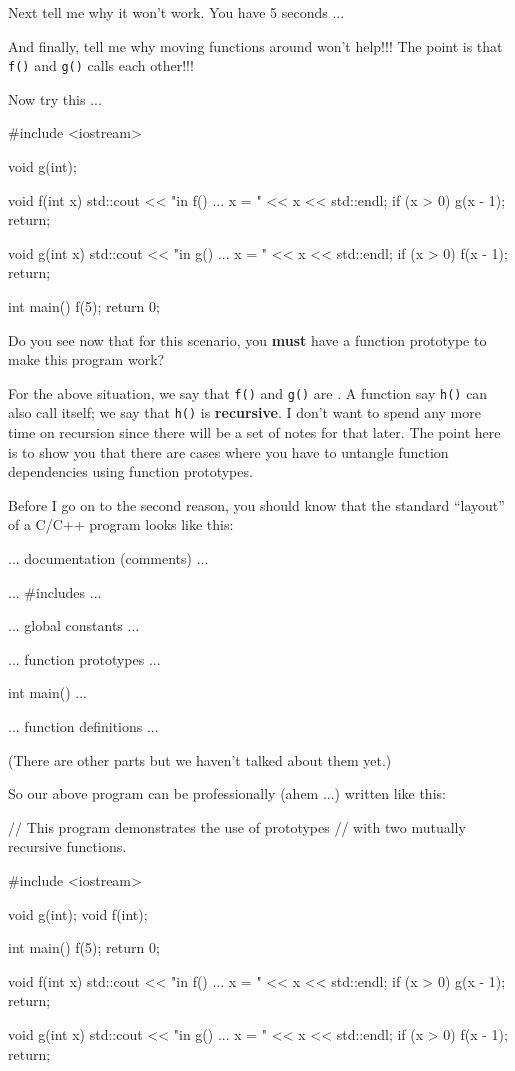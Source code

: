 Next tell me why it won't work. You have 5 seconds ...

And finally, tell me why moving functions around won't help!!! The point is
that \texttt{f()} and \texttt{g()} calls each other!!!

Now try this ...

\begin{consolethree}[escapeinside=||]
#include <iostream>

void g(int);

void f(int x)
{
    std::cout << "in f() ... x = " << x << std::endl;
    if (x > 0) g(x - 1);
    return;
}

void g(int x)
{
    std::cout << "in g() ... x = " << x << std::endl;
    if (x > 0) f(x - 1);
    return;
}

int main()
{
    f(5);
    return 0;
}
\end{consolethree}

Do you see now that for this scenario, you \textbf{must} have a function
prototype to make this program work?

For the above situation, we say that \texttt{f()} and \texttt{g()} are . A function say \texttt{h()} can also call itself; we say that \texttt{h()} is \textbf{recursive}. I don't want to spend any more time on recursion since there will be a set of notes for that later. The point here is to show you that there are cases where you have to untangle function dependencies using function prototypes.

Before I go on to the second reason, you should know that the standard ``layout'' of a C/C++ program looks like this:

\begin{consolethree}[escapeinside=||]
... documentation (comments) ...

... #includes ...

... global constants ...

... function prototypes ...

int main()
{
    ...
}

... function definitions ...
\end{consolethree}

(There are other parts but we haven't talked about them yet.)

So our above program can be professionally (ahem ...) written like this:

\begin{consolethree}[escapeinside=||]
// This program demonstrates the use of prototypes
// with two mutually recursive functions.

#include <iostream>

void g(int);
void f(int);

int main()
{
    f(5);
    return 0;
}

void f(int x)
{
    std::cout << "in f() ... x = " << x << std::endl;
    if (x > 0) g(x - 1);
    return;
}

void g(int x)
{
    std::cout << "in g() ... x = " << x << std::endl;
    if (x > 0) f(x - 1);
    return;
}
\end{consolethree}

